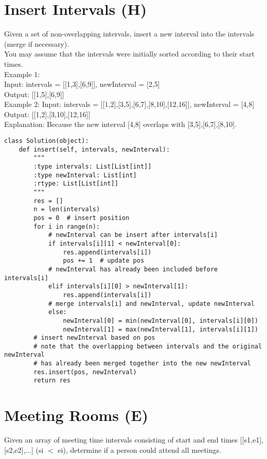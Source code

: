 \section{Insert Intervals (H)}
Given a set of non-overlapping intervals, insert a new interval into the intervals (merge if necessary).\\

You may assume that the intervals were initially sorted according to their start times.\\

Example 1:\\
Input: intervals = [[1,3],[6,9]], newInterval = [2,5]\\
Output: [[1,5],[6,9]]\\

Example 2:
Input: intervals = [[1,2],[3,5],[6,7],[8,10],[12,16]], newInterval = [4,8]\\
Output: [[1,2],[3,10],[12,16]]\\
Explanation: Because the new interval [4,8] overlaps with [3,5],[6,7],[8,10].\\

\begin{lstlisting}
class Solution(object):
    def insert(self, intervals, newInterval):
        """
        :type intervals: List[List[int]]
        :type newInterval: List[int]
        :rtype: List[List[int]]
        """
        res = []
        n = len(intervals)
        pos = 0  # insert position
        for i in range(n):
            # newInterval can be insert after intervals[i]
            if intervals[i][1] < newInterval[0]:
                res.append(intervals[i])
                pos += 1  # update pos
            # newInterval has already been included before intervals[i]
            elif intervals[i][0] > newInterval[1]:
                res.append(intervals[i])
            # merge intervals[i] and newInterval, update newInterval
            else:
                newInterval[0] = min(newInterval[0], intervals[i][0])
                newInterval[1] = max(newInterval[1], intervals[i][1])
        # insert newInterval based on pos
        # note that the overlapping between intervals and the original newInterval
        # has already been merged together into the new newInterval
        res.insert(pos, newInterval)
        return res
\end{lstlisting}

\section{Meeting Rooms (E)}
Given an array of meeting time intervals consisting of start and end times [[s1,e1],[s2,e2],...] (si $<$ ei), determine if a person could attend all meetings.\\

